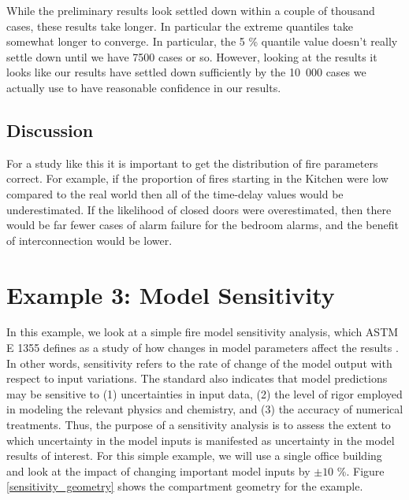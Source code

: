 \documentclass[12pt,twoside]{book}
\begin{document}
While the preliminary results look settled down within a couple of thousand cases, these results take longer. In particular the extreme quantiles take somewhat longer to converge. In particular, the 5 \% quantile value doesn't really settle down until we have 7500 cases or so. However, looking at the results it looks like our results have settled down sufficiently by the 10~000 cases we actually use to have reasonable confidence in our results.


\subsection{Discussion}\label{discussion}

For a study like this it is important to get the distribution of fire parameters correct. For example, if the proportion of fires starting in the Kitchen were low compared to the real world then all of the time-delay values would be underestimated. If the likelihood of closed doors were overestimated, then there would be far fewer cases of alarm failure for the bedroom alarms, and the benefit of interconnection would be lower.

%
%

\section{Example 3: Model Sensitivity}
\label{chapter:Sensitivity}

In this example, we look at a simple fire model sensitivity analysis, which ASTM E 1355 defines as a study of how changes in model parameters affect the results \cite{CFAST:ASTM:E1355}. In other words, sensitivity refers to the rate of change of the model output with respect to input variations. The standard also indicates that model predictions may be sensitive to (1) uncertainties in input data, (2) the level of rigor employed in modeling the relevant physics and chemistry, and (3) the accuracy of numerical treatments. Thus, the purpose of a sensitivity analysis is to assess the extent to which uncertainty in the model inputs is manifested as uncertainty in the model results of interest. For this simple example, we will use a single office building and look at the impact of changing important model inputs by $\pm 10$ \%. Figure \ref{sensitivity_geometry} shows the compartment geometry for the example.
\end{document}
